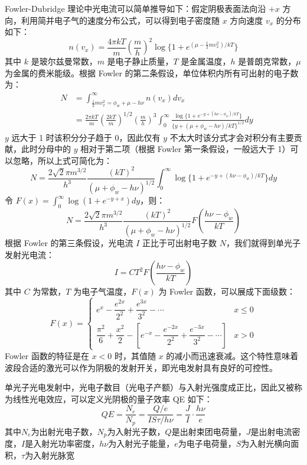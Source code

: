 Fowler-Dubridge 理论中光电流可以简单推导如下：假定阴极表面法向沿 $+x$ 方向，利用简并电子气的速度分布公式，可以得到电子密度随 $x$ 方向速度 $v_x$ 的分布如下：
	\[
	n(v_x) = \frac{4\pi kT}{m}\left(\frac{m}{h}\right)^2\log\{1+e^{(\mu-\frac{1}{2}mv_x^2)/kT}\}
	\]
其中 $k$ 是玻尔兹曼常数，$m$ 是电子静止质量，$T$ 是金属温度，$h$ 是普朗克常数，$\mu$ 为金属的费米能级。根据 Fowler 的第二条假设，单位体积内所有可出射的电子数为：
	\begin{eqnarray*}
	&N &= \int_{\frac{1}{2}mv_x^2=\phi_w+\mu-h\nu}^{\infty}n(v_x)dv_x\\
	&&= \frac{2\pi kT}{m}\left(\frac{2kT}{m}\right)^{1/2}\left(\frac{m}{h}\right)^3\int_0^{\infty}\frac{\log\{1+e^{-y+(h\nu-\phi_w)/kT}\}}{\{y+(\mu+\phi_w-h\nu)/kT\}^{1/2}}dy
	\end{eqnarray*}
	$y$ 远大于 1 时该积分分子趋于 0，因此仅有 $y$ 不太大时该分式才会对积分有主要贡献，此时分母中的 $y$ 相对于第二项（根据 Fowler 第一条假设，一般远大于 1）可以忽略，所以上式可简化为：
	\[
	N = \frac{2\sqrt{2}\pi m^{3/2}}{h^3}\frac{(kT)^2}{(\mu+\phi_w-h\nu)^{1/2}}\int_0^{\infty}\log\{1+e^{-y+(h\nu-\phi_w)/kT}\}dy
	\]
	令 $F(x) = \int_0^{\infty}\log(1+e^{-y+x})dy$，则：
	\[
	N = \frac{2\sqrt{2}\pi m^{3/2}}{h^3}\frac{(kT)^2}{(\mu+\phi_w-h\nu)^{1/2}}F\left(\frac{h\nu-\phi_w}{kT}\right)
	\]
	根据 Fowler 的第三条假设，光电流 $I$ 正比于可出射电子数 $N$，我们就得到单光子发射光电流：
	\begin{equation}
	I = CT^2F\left(\frac{h\nu-\phi_w}{kT}\right)
	\end{equation}
	其中 $C$ 为常数，$T$ 为电子气温度，$F(x)$ 为 Fowler 函数，可以展成下面级数：
	\[
	F(x) =
	\begin{cases}
	e^x-\dfrac{e^{2x}}{2^2}+\dfrac{e^{3x}}{3^2}-\cdots & x \le 0\\[10pt]
	\dfrac{\pi^2}{6}+\dfrac{x^2}{2}-\left[e^{-x}-\dfrac{e^{-2x}}{2^2}+\dfrac{e^{-3x}}{3^2}-\cdots\right] & x > 0
	\end{cases}
	\]
	Fowler 函数的特征是在 $x < 0$ 时，其值随 $x$ 的减小而迅速衰减。这个特性意味着波段合适的激光可以作为阴极的发射开关，即光电发射具有良好的可控性。

单光子光电发射中，光电子数目（光电子产额）与入射光强度成正比，因此又被称为线性光电效应，可以定义光阴极的量子效率 QE 如下：
	  \begin{equation}
	  QE = \frac{N_e}{N_p} = \frac{Q/e}{IS\tau/h\nu} = \frac{J}{I}\cdot\frac{h\nu}{e}
	  \end{equation}
	  其中$N_e$为出射光电子数，$N_p$为入射光子数，$Q$是出射束团电荷量，$J$是出射电流密度，$I$是入射光功率密度，$h\nu$为入射光子能量，$e$为电子电荷量，$S$为入射光横向面积，$\tau$为入射光脉宽


